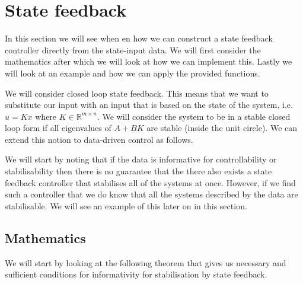 \section{State feedback}
In this section we will see when en how we can construct a state feedback controller directly from the state-input data. We will first consider the mathematics after which we will look at how we can implement this. Lastly we will look at an example and how we can apply the provided functions.

We will consider closed loop state feedback. This means that we want to substitute our input with an input that is based on the state of the system, i.e. $u = K x$ where $K \in \mathbb{R}^{m\times n}$. We will consider the system to be in a stable closed loop form if all eigenvalues of $A + B K$ are stable (inside the unit circle). We can extend this notion to data-driven control as follows.


We will start by noting that if the data is informative for controllability or stabilisability then there is no guarantee that the there also exists a state feedback controller that stabilises all of the systems at once. However, if we find such a controller that we do know that all the systems described by the data are stabilisable. We will see an example of this later on in this section.

\subsection{Mathematics}
We will start by looking at the following theorem that gives us necessary and sufficient conditions for informativity for stabilisation by state feedback.


